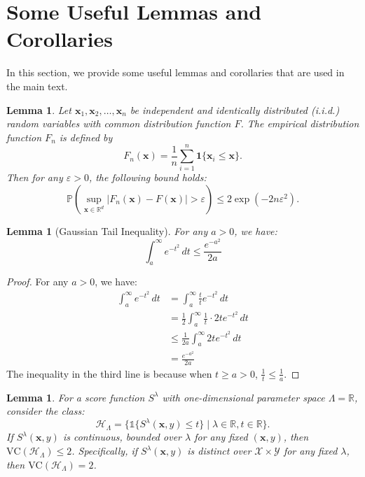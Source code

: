 \documentclass{article}
\newcommand{\1}{\mathbbm{1}}
\newcommand{\id}[1]{\mathds{1}\{#1\}}
\theoremstyle{plain}
\newtheorem{lemma}[theorem]{Lemma}
\theoremstyle{definition}
\theoremstyle{remark}
\begin{document}
\section{Some Useful Lemmas and Corollaries}
In this section, we provide some useful lemmas and corollaries that are used in the main text.
\label{sec:useful_lemmas}
\begin{lemma}\citep[Dvoretzky–Kiefer–Wolfowitz Inequality]{dvoretzky1956asymptotic,massart1990tight}
    \label{lemma:dkw_inequality}
    Let $\boldsymbol{x}_1, \boldsymbol{x}_2, \ldots, \boldsymbol{x}_n$ be independent and identically distributed (i.i.d.) random variables with common distribution function $F$. The empirical distribution function $F_n$ is defined by
    \begin{equation*}
        F_n(\boldsymbol{x}) = \frac{1}{n} \sum_{i=1}^n \mathbf{1}\{\boldsymbol{x}_i \leq \boldsymbol{x}\}.
    \end{equation*}
    Then for any $\varepsilon > 0$, the following bound holds:
    \begin{equation*}
        \mathbb{P}\left(\sup_{\boldsymbol{x}\in\mathbb{R}^d}|F_n(\boldsymbol{x}) - F(\boldsymbol{x})| > \varepsilon\right) \leq 2\exp(-2n\varepsilon^2).
    \end{equation*}
\end{lemma}

\begin{lemma}[Gaussian Tail Inequality]
    \label{lemma:tail_inequality}
    For any $a > 0$, we have:
    $$ \int_a^\infty e^{-t^2}\,dt \leq \frac{e^{-a^2}}{2a} $$
\end{lemma}
\begin{proof}
For any $a > 0$, we have:
\begin{align*}
    \int_a^\infty e^{-t^2}\,dt &= \int_a^\infty \frac{t}{t}e^{-t^2}\,dt \\
    &= \frac{1}{2}\int_a^\infty \frac{1}{t}\cdot 2te^{-t^2}\,dt \\
    &\leq \frac{1}{2a}\int_a^\infty 2te^{-t^2}\,dt \\
    &= \frac{e^{-a^2}}{2a}
\end{align*}
The inequality in the third line is because when $t \geq a > 0$, $\frac{1}{t} \leq \frac{1}{a}$.
\end{proof}

\begin{lemma}
    \label{lemma:tuning_bias_infinite_1d}
    For a score function $S^\lambda$ with one-dimensional parameter space $\Lambda = \mathbb{R}$, consider the class:
    \[
    \mathcal{H}_{\Lambda} = \{\id{S^\lambda(\boldsymbol{x},y)\le t} \mid \lambda\in \mathbb{R}, t\in \mathbb{R}\}.
     \]
    If $S^\lambda(\boldsymbol{x},y)$ is continuous, bounded over $\lambda$ for any fixed $(\boldsymbol{x},y)$, then $\text{VC}(\mathcal{H}_{\Lambda}) \leq 2$. Specifically, if $S^\lambda(\boldsymbol{x},y)$ is distinct over \(\mathcal{X} \times \mathcal{Y}\) for any fixed $\lambda$, then $\text{VC}(\mathcal{H}_{\Lambda}) = 2$.
\end{lemma}
\end{document}
